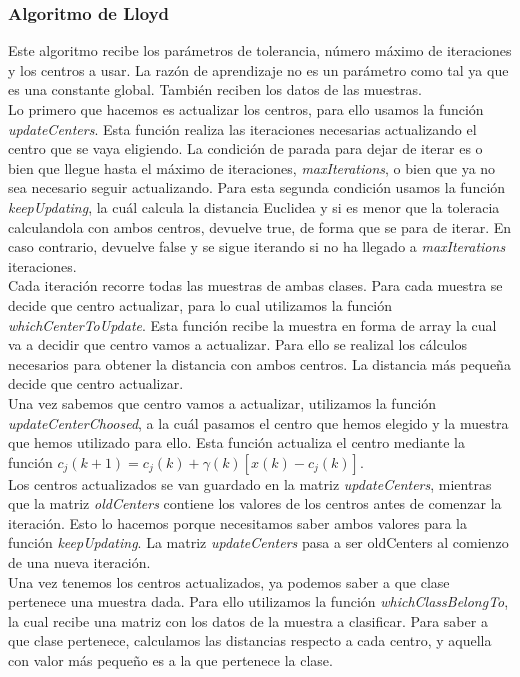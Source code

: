 \documentclass[12pt]{article}
\begin{document}
\subsubsection{Algoritmo de Lloyd}
Este algoritmo recibe los parámetros de tolerancia, número máximo de iteraciones y los centros a usar. La razón de aprendizaje no es un parámetro como tal ya que es una constante global. También reciben los datos de las muestras.\\
Lo primero que hacemos es actualizar los centros, para ello usamos la función \textit{updateCenters}. Esta función realiza las iteraciones necesarias actualizando el centro que se vaya eligiendo. La condición de parada para dejar de iterar es o bien que llegue hasta el máximo de iteraciones, \textit{maxIterations}, o bien que ya no sea necesario seguir actualizando. Para esta segunda condición usamos la función \textit{keepUpdating}, la cuál calcula la distancia Euclidea y si es menor que la toleracia calculandola con ambos centros, devuelve true, de forma que se para de iterar. En caso contrario, devuelve false y se sigue iterando si no ha llegado a\textit{ maxIterations} iteraciones.\\
Cada iteración recorre todas las muestras de ambas clases. Para cada muestra se decide que centro actualizar, para lo cual utilizamos la función \textit{whichCenterToUpdate}. Esta función recibe la muestra en forma de array la cual va a decidir que centro vamos a actualizar. Para ello se realizal los cálculos necesarios para obtener la distancia con ambos centros. La distancia más pequeña decide que centro actualizar.\\
Una vez sabemos que centro vamos a actualizar, utilizamos la función \textit{updateCenterChoosed}, a la cuál pasamos el centro que hemos elegido y la muestra que hemos utilizado para ello. Esta función actualiza el centro mediante la función 
$c_{j}(k+1)=c_{j}(k)+\gamma(k)[x(k)-c_{j}(k)]$.\\
Los centros actualizados se van guardado en la matriz \textit{updateCenters}, mientras que la matriz \textit{oldCenters} contiene los valores de los centros antes de comenzar la iteración. Esto lo hacemos porque necesitamos saber ambos valores para la función \textit{keepUpdating}. La matriz \textit{updateCenters} pasa a ser oldCenters al comienzo de una nueva iteración.\\
Una vez tenemos los centros actualizados, ya podemos saber a que clase pertenece una muestra dada. Para ello utilizamos la función \textit{whichClassBelongTo}, la cual recibe una matriz con los datos de la muestra a clasificar. Para saber a que clase pertenece, calculamos las distancias respecto a cada centro, y aquella con valor más pequeño es a la que pertenece la clase.
\end{document}
